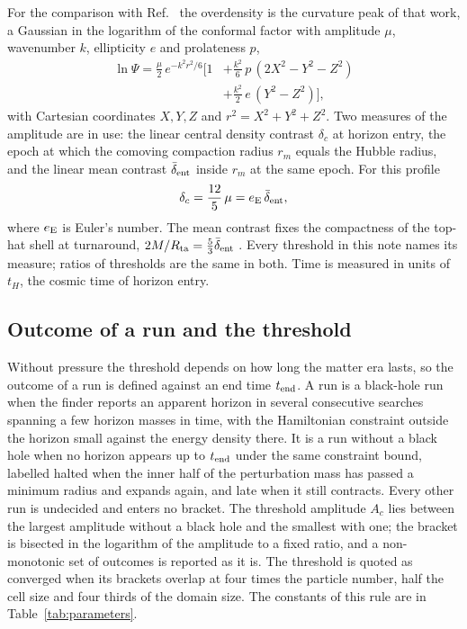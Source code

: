 \documentclass[aps,prd,twocolumn,10pt,superscriptaddress,nofootinbib,longbibliography,floatfix]{revtex4-2}
\begin{document}
For the comparison with Ref.~\cite{Yoo:2026mdpbh} the overdensity is the curvature peak of that work, a Gaussian in the logarithm of the conformal factor with amplitude $\mu$, wavenumber $k$, ellipticity $e$ and prolateness $p$,
\begin{equation}\label{eq:profile}
\begin{split}
\ln\Psi = \frac{\mu}{2}\, e^{-k^2 r^2/6}\Big[1&+\frac{k^2}{6}\,p\,(2X^2-Y^2-Z^2)\\
&+\frac{k^2}{2}\,e\,(Y^2-Z^2)\Big],
\end{split}
\end{equation}
with Cartesian coordinates $X,Y,Z$ and $r^2=X^2+Y^2+Z^2$. Two measures of the amplitude are in use: the linear central density contrast $\delta_c$ at horizon entry, the epoch at which the comoving compaction radius $r_m$ equals the Hubble radius, and the linear mean contrast $\bar\delta_{\rm ent}$ inside $r_m$ at the same epoch. For this profile
\begin{equation}\label{eq:conversion}
\delta_c = \frac{12}{5}\,\mu = e_{\rm E}\,\bar\delta_{\rm ent},
\end{equation}
where $e_{\rm E}$ is Euler's number. The mean contrast fixes the compactness of the top-hat shell at turnaround, $2M/R_{\rm ta}=\tfrac53\bar\delta_{\rm ent}$ \cite{Ebrahimian:2025md}. Every threshold in this note names its measure; ratios of thresholds are the same in both. Time is measured in units of $t_H$, the cosmic time of horizon entry.

\subsection{Outcome of a run and the threshold}\label{sec:outcome}

Without pressure the threshold depends on how long the matter era lasts, so the outcome of a run is defined against an end time $t_{\rm end}$. A run is a black-hole run when the finder reports an apparent horizon in several consecutive searches spanning a few horizon masses in time, with the Hamiltonian constraint outside the horizon small against the energy density there. It is a run without a black hole when no horizon appears up to $t_{\rm end}$ under the same constraint bound, labelled halted when the inner half of the perturbation mass has passed a minimum radius and expands again, and late when it still contracts. Every other run is undecided and enters no bracket. The threshold amplitude $A_c$ lies between the largest amplitude without a black hole and the smallest with one; the bracket is bisected in the logarithm of the amplitude to a fixed ratio, and a non-monotonic set of outcomes is reported as it is. The threshold is quoted as converged when its brackets overlap at four times the particle number, half the cell size and four thirds of the domain size. The constants of this rule are in Table~\ref{tab:parameters}.
\end{document}
